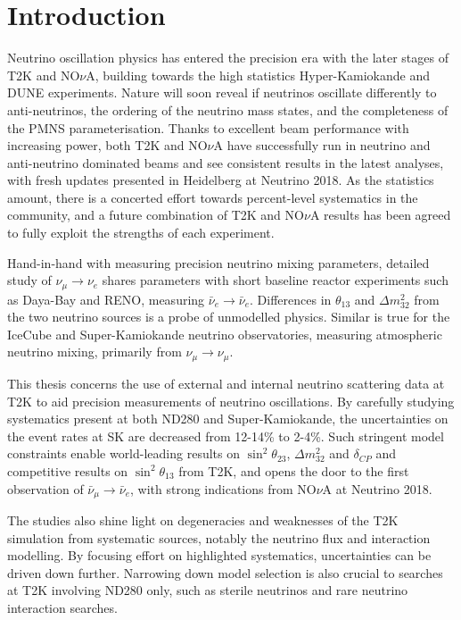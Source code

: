 \chapter{Introduction}
\label{chap:intro}
Neutrino oscillation physics has entered the precision era with the later stages of T2K\cite{t2k_2017} and NO$\nu$A\cite{nova_2018}, building towards the high statistics Hyper-Kamiokande\cite{hyperk} and DUNE\cite{dune} experiments. Nature will soon reveal if neutrinos oscillate differently to anti-neutrinos, the ordering of the neutrino mass states, and the completeness of the PMNS parameterisation\cite{p1,p2,mns}. Thanks to excellent beam performance with increasing power, both T2K and NO$\nu$A have successfully run in neutrino and anti-neutrino dominated beams and see consistent results in the latest analyses, with fresh updates presented in Heidelberg at Neutrino 2018\cite{t2k_neutrino2018, nova_neutrino2018}. As the statistics amount, there is a concerted effort towards percent-level systematics in the community, and a future combination of T2K and NO$\nu$A results has been agreed\cite{t2k_nova, t2k_nova_meet} to fully exploit the strengths of each experiment.

Hand-in-hand with measuring precision neutrino mixing parameters, detailed study of $\nu_\mu \rightarrow \nu_e$ shares parameters with short baseline reactor experiments such as Daya-Bay\cite{daya_bay} and RENO\cite{reno}, measuring $\bar{\nu}_e\rightarrow \bar{\nu}_e$. Differences in $\theta_{13}$ and $\Delta m^2_{32}$ from the two neutrino sources is a probe of unmodelled physics. Similar is true for the IceCube\cite{icecube} and Super-Kamiokande\cite{superk} neutrino observatories, measuring atmospheric neutrino mixing, primarily from $\nu_\mu \rightarrow \nu_\mu$.

This thesis concerns the use of external and internal neutrino scattering data at T2K to aid precision measurements of neutrino oscillations. By carefully studying systematics present at both ND280 and Super-Kamiokande, the uncertainties on the event rates at SK are decreased from 12-14\% to 2-4\%. Such stringent model constraints enable world-leading results on $\sin^2\theta_{23}$, $\Delta m^2_{32}$ and $\delta_{CP}$ and competitive results on $\sin^2\theta_{13}$ from T2K\cite{pdg_2017}, and opens the door to the first observation of $\bar{\nu}_\mu \rightarrow \bar{\nu}_e$, with strong indications from NO$\nu$A at Neutrino 2018\cite{nova_neutrino2018}.

The studies also shine light on degeneracies and weaknesses of the T2K simulation from systematic sources, notably the neutrino flux and interaction modelling. By focusing effort on highlighted systematics, uncertainties can be driven down further. Narrowing down model selection is also crucial to searches at T2K involving ND280 only, such as sterile neutrinos and rare neutrino interaction searches.


